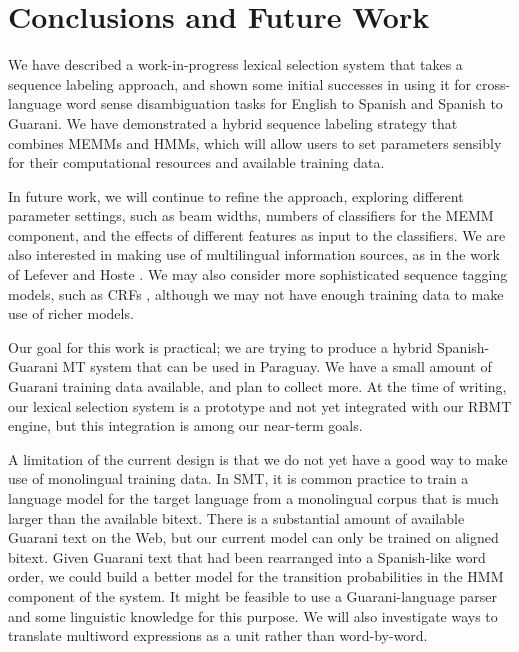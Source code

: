 \documentclass[11pt]{article}
\begin{document}
\section{Conclusions and Future Work}
We have described a work-in-progress lexical selection system that takes a
sequence labeling approach, and shown some initial successes in using it for
cross-language word sense disambiguation tasks for English to Spanish and
Spanish to Guarani.  We have demonstrated a hybrid sequence labeling strategy
that combines MEMMs and HMMs, which will allow users to set parameters sensibly
for their computational resources and available training data.

In future work, we will continue to refine the approach, exploring different
parameter settings, such as beam widths, numbers of classifiers for the MEMM
component, and the effects of different features as input to the classifiers.
We are also interested in making use of multilingual information sources,
as in the work of Lefever and Hoste
. We may also consider more
sophisticated sequence tagging models, such as CRFs
\cite{DBLP:conf/icml/LaffertyMP01}, although we may not have enough training
data to make use of richer models.

Our goal for this work is practical; we are trying to produce a hybrid
Spanish-Guarani MT system that can be used in Paraguay. We have a small amount
of Guarani training data available, and plan to collect more.  At the time of
writing, our lexical selection system is a prototype and not yet integrated
with our RBMT engine, but this integration is among our near-term goals.

A limitation of the current design is that we do not yet have a good way to
make use of monolingual training data. In SMT, it is common practice to train a
language model for the target language from a monolingual corpus that is much
larger than the available bitext. There is a substantial amount of available
Guarani text on the Web, but our current
model can only be trained on aligned bitext. Given Guarani text that had been
rearranged into a Spanish-like word order, we could build a better model for
the transition probabilities in the HMM component of the system. It might be
feasible to use a Guarani-language parser and some linguistic knowledge for
this purpose.
We will also investigate ways to translate multiword expressions as a unit
rather than word-by-word.


{}
\end{document}
